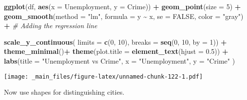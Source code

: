 \documentclass[
]{book}
\newenvironment{Shaded}{\begin{snugshade}}{\end{snugshade}}
\newcommand{\AttributeTok}[1]{\textcolor[rgb]{0.13,0.29,0.53}{#1}}
\newcommand{\CommentTok}[1]{\textcolor[rgb]{0.56,0.35,0.01}{\textit{#1}}}
\newcommand{\ConstantTok}[1]{\textcolor[rgb]{0.56,0.35,0.01}{#1}}
\newcommand{\DecValTok}[1]{\textcolor[rgb]{0.00,0.00,0.81}{#1}}
\newcommand{\FloatTok}[1]{\textcolor[rgb]{0.00,0.00,0.81}{#1}}
\newcommand{\FunctionTok}[1]{\textcolor[rgb]{0.13,0.29,0.53}{\textbf{#1}}}
\newcommand{\NormalTok}[1]{#1}
\newcommand{\SpecialCharTok}[1]{\textcolor[rgb]{0.81,0.36,0.00}{\textbf{#1}}}
\newcommand{\StringTok}[1]{\textcolor[rgb]{0.31,0.60,0.02}{#1}}
\begin{document}
\begin{Shaded}
\begin{Highlighting}[]
\FunctionTok{ggplot}\NormalTok{(df, }\FunctionTok{aes}\NormalTok{(}\AttributeTok{x =}\NormalTok{ Unemployment, }\AttributeTok{y =}\NormalTok{ Crime)) }\SpecialCharTok{+}
  \FunctionTok{geom\_point}\NormalTok{(}\AttributeTok{size =} \DecValTok{5}\NormalTok{) }\SpecialCharTok{+}
  \FunctionTok{geom\_smooth}\NormalTok{(}\AttributeTok{method =} \StringTok{"lm"}\NormalTok{, }\AttributeTok{formula =}\NormalTok{ y }\SpecialCharTok{\textasciitilde{}}\NormalTok{ x, }\AttributeTok{se =} \ConstantTok{FALSE}\NormalTok{, }\AttributeTok{color =} \StringTok{"gray"}\NormalTok{) }\SpecialCharTok{+}  \CommentTok{\# Adding the regression line}

  \FunctionTok{scale\_y\_continuous}\NormalTok{(}
    \AttributeTok{limits =} \FunctionTok{c}\NormalTok{(}\DecValTok{0}\NormalTok{, }\DecValTok{10}\NormalTok{),}
    \AttributeTok{breaks =} \FunctionTok{seq}\NormalTok{(}\DecValTok{0}\NormalTok{, }\DecValTok{10}\NormalTok{, }\AttributeTok{by =} \DecValTok{1}\NormalTok{)) }\SpecialCharTok{+}
  \FunctionTok{theme\_minimal}\NormalTok{()}\SpecialCharTok{+}
  \FunctionTok{theme}\NormalTok{(}\AttributeTok{plot.title =} \FunctionTok{element\_text}\NormalTok{(}\AttributeTok{hjust =} \FloatTok{0.5}\NormalTok{)) }\SpecialCharTok{+}
  \FunctionTok{labs}\NormalTok{(}\AttributeTok{title =} \StringTok{"Unemployment vs Crime"}\NormalTok{,}
       \AttributeTok{x =} \StringTok{"Unemployment"}\NormalTok{,}
       \AttributeTok{y =} \StringTok{"Crime"}
\NormalTok{       )}
\end{Highlighting}
\end{Shaded}

\texttt{[image: \_main\_files/figure-latex/unnamed-chunk-122-1.pdf]}

Now use shapes for distinguishing cities.
\end{document}
